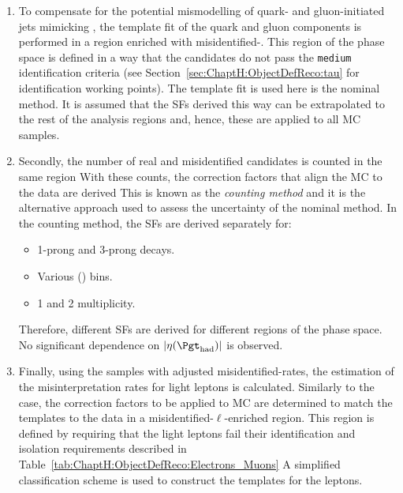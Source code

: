 \begin{enumerate}
	\item To compensate for the potential mismodelling of quark- and gluon-initiated jets mimicking \tauhad, 
		the template fit of the quark and gluon components is performed in a region enriched with 
		misidentified-\tauhad. This region of the phase space is defined in a way that the \tauhad candidates
		do not pass the \texttt{medium} identification criteria (see Section~\ref{sec:ChaptH:ObjectDefReco:tau}
		for identification working points).
		The template fit is used here is the nominal method. It is assumed that the SFs derived this 
		way can be extrapolated to the rest
		of the analysis regions and, hence, these are applied to all MC samples.


	\item Secondly, the number of real and misidentified \tauhad candidates is counted in the same region
		With these counts, the correction factors
		that align the MC to the data are derived
		This is known as the \textit{counting method} and it is the alternative approach
		used to assess the uncertainty of the nominal method.
		In the counting method, the SFs are derived separately for:  
		\begin{itemize}
			\item 1-prong and 3-prong \tauhad decays. 
			\item  Various \pT(\tauhad) bins.
			\item  1 and 2 \bjets multiplicity.
		\end{itemize}
		Therefore, different SFs are derived for different regions of the phase space. 
		No significant dependence on $|\eta(\tauhad)|$ is observed.
		
		
	\item Finally, using the samples with adjusted misidentified-\tauhad rates, the estimation of the 
		misinterpretation rates for light leptons is calculated. Similarly to the \tauhad case,
		the correction factors to be applied to MC are determined to match the templates to the data in a 
		misidentified-$\ell$-enriched region.
		This region is defined by requiring that the light leptons fail their 
		identification and isolation requirements described in 
		Table~\ref{tab:ChaptH:ObjectDefReco:Electrons_Muons}
		 A simplified classification scheme is used to construct the templates
		for the leptons.
\end{enumerate}



